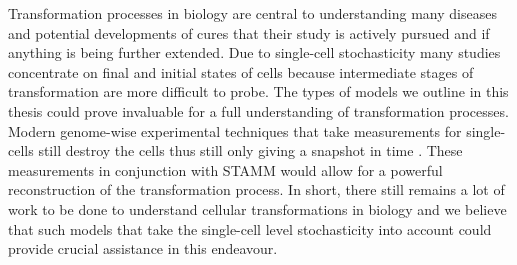 Transformation processes in biology are central to understanding many diseases and potential developments of cures that their study is actively pursued and if anything is being further extended. Due to single-cell stochasticity many studies concentrate on final and initial states of cells because intermediate stages of transformation are more difficult to probe. The types of models we outline in this thesis could prove invaluable for a full understanding of transformation processes. Modern genome-wise experimental techniques that take measurements for single-cells still destroy the cells thus still only giving a snapshot in time \cite{deSouza:2012dz}. These measurements in conjunction with STAMM would allow for a powerful reconstruction of the transformation process. In short, there still remains a lot of work to be done to understand cellular transformations in biology and we believe that such models that take the single-cell level stochasticity into account could provide crucial assistance in this endeavour. 

